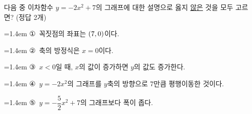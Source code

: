 다음 중 이차함수 $y=-2x^2+7$의 그래프에 대한 설명으로 옳지 \underline{않은} 것을 모두 고르면? (정답 2개)
\par\medskip\par\noindent\hangindent=1.4em {\small ①}\ 꼭짓점의 좌표는 $(7{,}\mkern3mu 0)$이다.\par\noindent\hangindent=1.4em {\small ②}\ 축의 방정식은 $x=0$이다.\par\noindent\hangindent=1.4em {\small ③}\ $x<0$일 때, $x$의 값이 증가하면 $y$의 값도 증가한다.\par\noindent\hangindent=1.4em {\small ④}\ $y=-2x^2$의 그래프를 $y$축의 방향으로 $7$만큼 평행이동한 것이다.\par\noindent\hangindent=1.4em {\small ⑤}\ $y=-\dfrac{5}{2}x^2+7$의 그래프보다 폭이 좁다.\par\medskip
